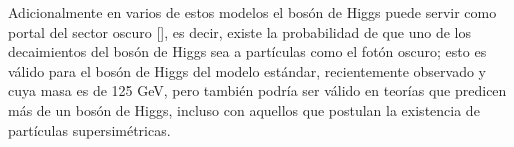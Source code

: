 Adicionalmente en varios de estos modelos el bosón de Higgs puede servir como
portal del sector oscuro [], es decir, existe la probabilidad de que uno de los decaimientos del bosón de Higgs sea a partículas como el fotón oscuro; esto es válido para el bosón de Higgs del modelo estándar, recientemente observado y cuya masa es de 125 GeV, pero también podría ser válido en teorías que predicen más de un bosón de Higgs, incluso con aquellos que postulan la existencia de partículas
supersimétricas.















